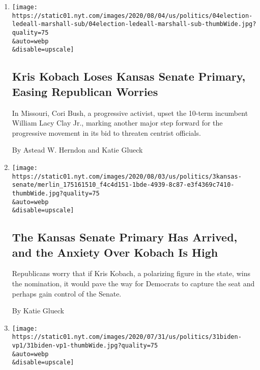 \begin{enumerate}
\def\labelenumi{\arabic{enumi}.}
\item
  \href{/2020/08/04/us/politics/kobach-tlaib.html}{}

  \texttt{[image: https://static01.nyt.com/images/2020/08/04/us/politics/04election-ledeall-marshall-sub/04election-ledeall-marshall-sub-thumbWide.jpg?quality=75\\\&auto=webp\\\&disable=upscale]}

  \hypertarget{kris-kobach-loses-kansas-senate-primary-easing-republican-worries}{%
  \subsection{Kris Kobach Loses Kansas Senate Primary, Easing Republican
  Worries}\label{kris-kobach-loses-kansas-senate-primary-easing-republican-worries}}

  In Missouri, Cori Bush, a progressive activist, upset the 10-term
  incumbent William Lacy Clay Jr., marking another major step forward
  for the progressive movement in its bid to threaten centrist
  officials.

  By Astead W. Herndon and Katie Glueck
\item
  \href{/2020/08/03/us/politics/kris-kobach-kansas-senate-primary.html}{}

  \texttt{[image: https://static01.nyt.com/images/2020/08/03/us/politics/3kansas-senate/merlin\_175161510\_f4c4d151-1bde-4939-8c87-e3f4369c7410-thumbWide.jpg?quality=75\\\&auto=webp\\\&disable=upscale]}

  \hypertarget{the-kansas-senate-primary-has-arrived-and-the-anxiety-over-kobach-is-high}{%
  \subsection{The Kansas Senate Primary Has Arrived, and the Anxiety
  Over Kobach Is
  High}\label{the-kansas-senate-primary-has-arrived-and-the-anxiety-over-kobach-is-high}}

  Republicans worry that if Kris Kobach, a polarizing figure in the
  state, wins the nomination, it would pave the way for Democrats to
  capture the seat and perhaps gain control of the Senate.

  By Katie Glueck
\item
  \href{/2020/07/31/us/politics/joseph-biden-vice-president.html}{}

  \texttt{[image: https://static01.nyt.com/images/2020/07/31/us/politics/31biden-vp1/31biden-vp1-thumbWide.jpg?quality=75\\\&auto=webp\\\&disable=upscale]}


\end{enumerate}
